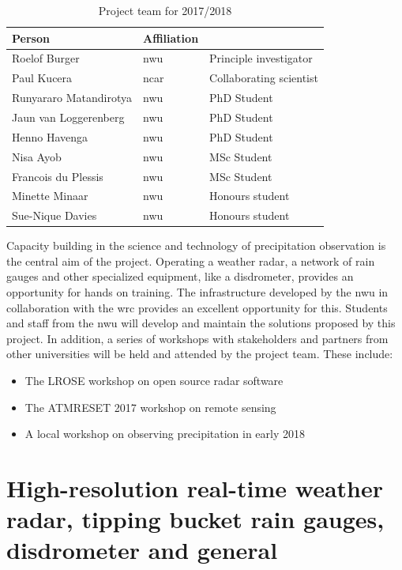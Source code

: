 \documentclass{wrcreport}
\begin{document}
\begin{table}[!htbp]
\caption{Project team for 2017/2018}
\label{table:team}
\begin{center}
\begin{tabular}{ l l l } 
\toprule
\bfseries Person & \bfseries Affiliation \\
\midrule
Roelof Burger & \gls{nwu}& Principle investigator \\
Paul Kucera  & \gls{ncar}& Collaborating scientist \\
Runyararo Matandirotya & \gls{nwu} & PhD Student \\
Jaun van Loggerenberg & \gls{nwu} & PhD Student \\
Henno Havenga & \gls{nwu} & PhD Student \\
Nisa Ayob & \gls{nwu} & MSc Student \\
Francois du Plessis & \gls{nwu} & MSc Student \\
Minette Minaar & \gls{nwu} & Honours student \\
Sue-Nique Davies & \gls{nwu} & Honours student \\
\bottomrule 
\end{tabular}
\end{center}
\end{table}

Capacity building in the science and technology of precipitation
observation is the central aim of the project. Operating a weather
radar, a network of rain gauges and other specialized equipment, like
a disdrometer, provides an opportunity for hands on training. The
infrastructure developed by the \gls{nwu} in collaboration with the
\gls{wrc} provides an excellent opportunity for this. Students and
staff from the \gls{nwu} will develop and maintain the solutions
proposed by this project. In addition, a series of workshops with
stakeholders and partners from other universities will be held and
attended by the project team. These include:

\begin{itemize}
\item The LROSE workshop on open source radar software
\item The ATMRESET 2017 workshop on remote sensing
\item A local workshop on observing precipitation in early 2018
\end{itemize}

\section{High-resolution real-time weather radar, tipping bucket rain gauges, disdrometer and general}
\end{document}
